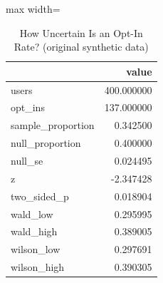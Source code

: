\begin{table}[htbp]
\centering
\caption{How Uncertain Is an Opt-In Rate? (original synthetic data)}
\begingroup
\small
\setlength{\tabcolsep}{6pt}
\renewcommand{\arraystretch}{1.12}
\begin{adjustbox}{max width=\linewidth}
\begin{tabular}{@{}lr@{}}
\toprule
 & value \\
\midrule
users & 400.000000 \\
opt\_ins & 137.000000 \\
sample\_proportion & 0.342500 \\
null\_proportion & 0.400000 \\
null\_se & 0.024495 \\
z & -2.347428 \\
two\_sided\_p & 0.018904 \\
wald\_low & 0.295995 \\
wald\_high & 0.389005 \\
wilson\_low & 0.297691 \\
wilson\_high & 0.390305 \\
\bottomrule
\end{tabular}
\end{adjustbox}
\endgroup
\end{table}